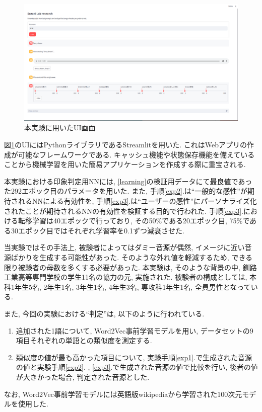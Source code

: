 \documentclass[a4paper,11pt,dvipdfmx]{jreport}
\begin{document}
\begin{figure}[htbp]
  \centering
  \includegraphics[width=0.9\linewidth]{UI.png}
  \caption{本実験に用いたUI画面}
  \label{UI1}
\end{figure}

図\ref{UI1}のUIにはPythonライブラリであるStreamlit\cite{stream}を用いた.
これはWebアプリの作成が可能なフレームワークである. 
キャッシュ機能や状態保存機能を備えていることから機械学習を用いた簡易アプリケーションを作成する際に重宝される.

本実験における印象判定用NNには, \ref{learning}の検証用データにて最良値であった292エポック目のパラメータを用いた.
また, 手順\ref{exp2}.は``一般的な感性''が期待されるNNによる有効性を, 手順\ref{exp3}.は``ユーザーの感性''にパーソナライズ化されたことが期待されるNNの有効性を検証する目的で行われた.
手順\ref{exp3}.における転移学習は40エポックで行っており, その50\%である20エポック目, 75\%である30エポック目ではそれぞれ学習率を0.1ずつ減衰させた.


当実験ではその手法上, 被験者によってはダミー音源が偶然, イメージに近い音源ばかりを生成する可能性があった.
そのような外れ値を軽減するため, できる限り被験者の母数を多くする必要があった.
本実験は, そのような背景の中, 釧路工業高等専門学校の学生11名の協力の元, 実施された.
被験者の構成としては, 本科1年生5名, 2年生1名, 3年生1名, 4年生3名, 専攻科1年生1名, 全員男性となっている.

また, 今回の実験における``判定''は, 以下のように行われている.
\begin{enumerate}
  \item 追加された1語について, Word2Vec事前学習モデルを用い, 
        データセットの9項目それぞれの単語との類似度を測定する.
  \item 類似度の値が最も高かった項目について, 
        実験手順\ref{exp1}.で生成された音源の値と実験手順\ref{exp2}. , \ref{exp3}.で生成された音源の値で比較を行い, 後者の値が大きかった場合, 
        判定された音源とした.
\end{enumerate}
なお, Word2Vec事前学習モデルには英語版wikipediaから学習された100次元モデル\cite{NLP}を使用した.
\end{document}
